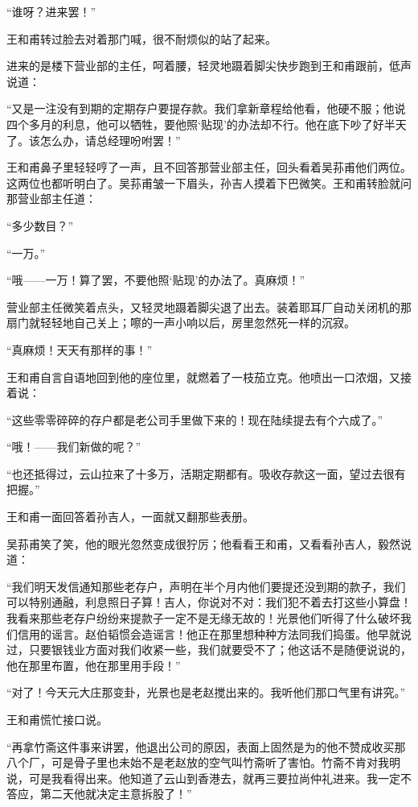 \par “谁呀？进来罢！”
\par 王和甫转过脸去对着那门喊，很不耐烦似的站了起来。
\par 进来的是楼下营业部的主任，呵着腰，轻灵地蹑着脚尖快步跑到王和甫跟前，低声说道：
\par “又是一注没有到期的定期存户要提存款。我们拿新章程给他看，他硬不服；他说四个多月的利息，他可以牺牲，要他照‘贴现’的办法却不行。他在底下吵了好半天了。该怎么办，请总经理吩咐罢！”
\par 王和甫鼻子里轻轻哼了一声，且不回答那营业部主任，回头看着吴荪甫他们两位。这两位也都听明白了。吴荪甫皱一下眉头，孙吉人摸着下巴微笑。王和甫转脸就问那营业部主任道：
\par “多少数目？”
\par “一万。”
\par “哦——一万！算了罢，不要他照‘贴现’的办法了。真麻烦！”
\par 营业部主任微笑着点头，又轻灵地蹑着脚尖退了出去。装着耶耳厂自动关闭机的那扇门就轻轻地自己关上；嚓的一声小响以后，房里忽然死一样的沉寂。
\par “真麻烦！天天有那样的事！”
\par 王和甫自言自语地回到他的座位里，就燃着了一枝茄立克。他喷出一口浓烟，又接着说：
\par “这些零零碎碎的存户都是老公司手里做下来的！现在陆续提去有个六成了。”
\par “哦！——我们新做的呢？”
\par “也还抵得过，云山拉来了十多万，活期定期都有。吸收存款这一面，望过去很有把握。”
\par 王和甫一面回答着孙吉人，一面就又翻那些表册。
\par 吴荪甫笑了笑，他的眼光忽然变成很狞厉；他看看王和甫，又看看孙吉人，毅然说道：
\par “我们明天发信通知那些老存户，声明在半个月内他们要提还没到期的款子，我们可以特别通融，利息照日子算！吉人，你说对不对：我们犯不着去打这些小算盘！我看来那些老存户纷纷来提款子一定不是无缘无故的！光景他们听得了什么破坏我们信用的谣言。赵伯韬惯会造谣言！他正在那里想种种方法同我们捣蛋。他早就说过，只要银钱业方面对我们收紧一些，我们就要受不了；他这话不是随便说说的，他在那里布置，他在那里用手段！”
\par “对了！今天元大庄那变卦，光景也是老赵搅出来的。我听他们那口气里有讲究。”
\par 王和甫慌忙接口说。
\par “再拿竹斋这件事来讲罢，他退出公司的原因，表面上固然是为的他不赞成收买那八个厂，可是骨子里也未始不是老赵放的空气叫竹斋听了害怕。竹斋不肯对我明说，可是我看得出来。他知道了云山到香港去，就再三要拉尚仲礼进来。我一定不答应，第二天他就决定主意拆股了！”
